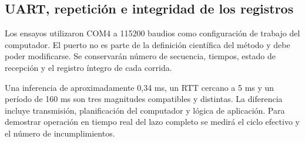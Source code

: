 \subsection{UART, repetición e integridad de los registros}
Los ensayos utilizaron COM4 a 115200 baudios como configuración de trabajo del computador. El puerto no es parte de la definición científica del método y debe poder modificarse. Se conservarán número de secuencia, tiempos, estado de recepción y el registro íntegro de cada corrida.

Una inferencia de aproximadamente 0,34 ms, un RTT cercano a 5 ms y un período de 160 ms son tres magnitudes compatibles y distintas. La diferencia incluye transmisión, planificación del computador y lógica de aplicación. Para demostrar operación en tiempo real del lazo completo se medirá el ciclo efectivo y el número de incumplimientos.
